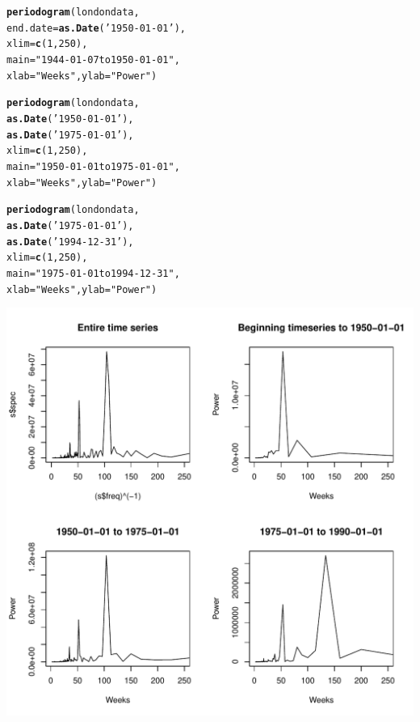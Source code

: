 \documentclass[12pt]{article}\usepackage[]{graphicx}\usepackage[]{color}
\makeatletter
\def\maxwidth{ %
  \ifdim\Gin@nat@width>\linewidth
    \linewidth
  \else
    \Gin@nat@width
  \fi
}
\newcommand{\hlnum}[1]{\textcolor[rgb]{0.686,0.059,0.569}{#1}}%
\newcommand{\hlstr}[1]{\textcolor[rgb]{0.192,0.494,0.8}{#1}}%
\newcommand{\hlstd}[1]{\textcolor[rgb]{0.345,0.345,0.345}{#1}}%
\newcommand{\hlkwc}[1]{\textcolor[rgb]{0.333,0.667,0.333}{#1}}%
\newcommand{\hlkwd}[1]{\textcolor[rgb]{0.737,0.353,0.396}{\textbf{#1}}}%
\newenvironment{kframe}{%
 \def\at@end@of@kframe{}%
 \ifinner\ifhmode%
  \def\at@end@of@kframe{\end{minipage}}%
  \begin{minipage}{\columnwidth}%
 \fi\fi%
 \def\FrameCommand##1{\hskip\@totalleftmargin \hskip-\fboxsep
 \colorbox{shadecolor}{##1}\hskip-\fboxsep
     \hskip-\linewidth \hskip-\@totalleftmargin \hskip\columnwidth}%
 \MakeFramed {\advance\hsize-\width
   \@totalleftmargin\z@ \linewidth\hsize
   \@setminipage}}%
 {\par\unskip\endMakeFramed%
 \at@end@of@kframe}
\newenvironment{knitrout}{}{} %
\makeatother
\begin{document}
\begin{enumerate}[(a)]
\begin{knitrout}
\begin{kframe}
\begin{alltt}
\hlkwd{periodogram}\hlstd{(londondata,}
            \hlkwc{end.date}\hlstd{=}\hlkwd{as.Date}\hlstd{(}\hlstr{'1950-01-01'}\hlstd{),}
            \hlkwc{xlim}\hlstd{=}\hlkwd{c}\hlstd{(}\hlnum{1}\hlstd{,}\hlnum{250}\hlstd{),}
            \hlkwc{main}\hlstd{=}\hlstr{"1944-01-07 to 1950-01-01"}\hlstd{,}
            \hlkwc{xlab}\hlstd{=}\hlstr{"Weeks"}\hlstd{,} \hlkwc{ylab}\hlstd{=}\hlstr{"Power"}\hlstd{)}

\hlkwd{periodogram}\hlstd{(londondata,}
            \hlkwd{as.Date}\hlstd{(}\hlstr{'1950-01-01'}\hlstd{),}
            \hlkwd{as.Date}\hlstd{(}\hlstr{'1975-01-01'}\hlstd{),}
            \hlkwc{xlim}\hlstd{=}\hlkwd{c}\hlstd{(}\hlnum{1}\hlstd{,}\hlnum{250}\hlstd{),}
            \hlkwc{main}\hlstd{=}\hlstr{"1950-01-01 to 1975-01-01"}\hlstd{,}
            \hlkwc{xlab}\hlstd{=}\hlstr{"Weeks"}\hlstd{,} \hlkwc{ylab}\hlstd{=}\hlstr{"Power"}\hlstd{)}

\hlkwd{periodogram}\hlstd{(londondata,}
            \hlkwd{as.Date}\hlstd{(}\hlstr{'1975-01-01'}\hlstd{),}
            \hlkwd{as.Date}\hlstd{(}\hlstr{'1994-12-31'}\hlstd{),}
            \hlkwc{xlim}\hlstd{=}\hlkwd{c}\hlstd{(}\hlnum{1}\hlstd{,}\hlnum{250}\hlstd{),}
            \hlkwc{main}\hlstd{=}\hlstr{"1975-01-01 to 1994-12-31"}\hlstd{,}
            \hlkwc{xlab}\hlstd{=}\hlstr{"Weeks"}\hlstd{,} \hlkwc{ylab}\hlstd{=}\hlstr{"Power"}\hlstd{)}
\end{alltt}
\end{kframe}
\includegraphics[width=\maxwidth]{figure/unnamed-chunk-4-2} 


\end{knitrout}
\end{enumerate}
\end{document}
